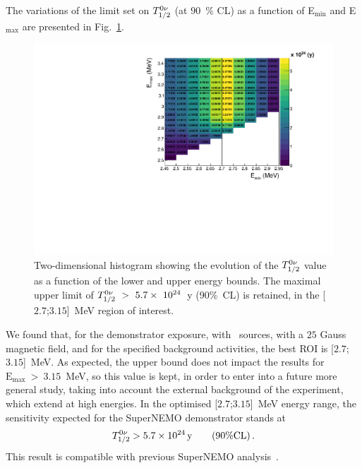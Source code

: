 The variations of the limit set on $T_{1/2}^{0\nu}$ (at $90$~\% CL) as a function of E$_{\text{min}}$ and E$_{\text{max}}$ are presented in Fig.~\ref{fig:sensitivity_cont}.
\begin{figure}[h!]
  \centering
  \includegraphics[width=1.1\textwidth]{Sensitivity/fig_sensitivity/sensitivity_spectrum_with_B_82Se.pdf}
  \caption{Two-dimensional histogram showing the evolution of the $T_{1/2}^{0\nu}$ value as a function of the lower and upper energy bounds.
    The maximal upper limit of $T_{1/2}^{0\nu}~>~5.7\times~10^{24}$~y (90\%~CL) is retained, in the [$2.7$;$3.15$]~MeV region of interest.
    \label{fig:sensitivity_cont}}
\end{figure}
We found that, for the demonstrator exposure, with \Se\ sources, with a $25$ Gauss magnetic field, and for the specified background activities, the best ROI is [$2.7$;$3.15$]~MeV.
As expected, the upper bound does not impact the results for $\text{E}_{\text{max}}~>~3.15$~MeV, so this value is kept, in order to enter into a future more general study, taking into account the external background of the experiment, which extend at high energies.
In the optimised [$2.7$;$3.15$]~MeV energy range, the sensitivity expected for the SuperNEMO demonstrator stands at
\begin{equation}
T_{1/2}^{0\nu} > 5.7\times 10^{24}\,\text{y}\qquad (90\% \text{CL})\,.
\end{equation}
This result is compatible with previous SuperNEMO analysis~\cite{CalvezThesis}.


